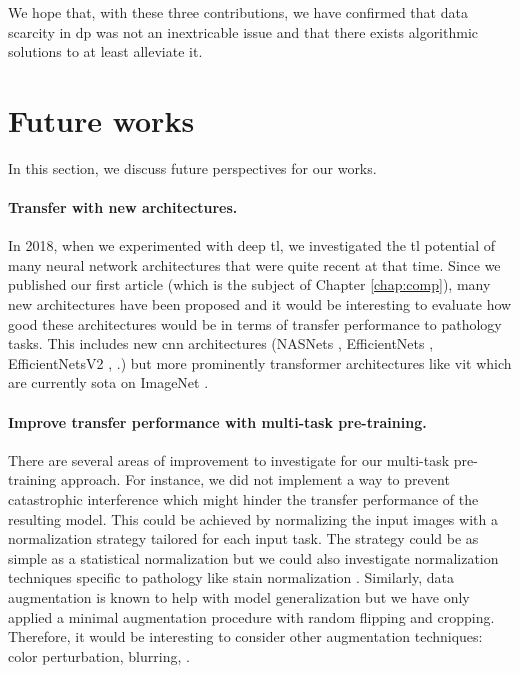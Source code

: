 We hope that, with these three contributions, we have confirmed that data scarcity in \acrlong{dp} was not an inextricable issue and that there exists algorithmic solutions to at least alleviate it. 

\section{Future works}
\label{sec:concl:futureworks}

In this section, we discuss future perspectives for our works.

\paragraph{Transfer with new architectures.} In 2018, when we experimented with deep \acrlong{tl}, we investigated the \acrlong{tl} potential of many neural network architectures that were quite recent at that time. Since we published our first article (which is the subject of Chapter \ref{chap:comp}), many new architectures have been proposed and it would be interesting to evaluate how good these architectures would be in terms of transfer performance to pathology tasks. This includes new \acrlong{cnn} architectures (\eg NASNets \cite{zoph2018learning}, EfficientNets \cite{tan2019efficientnet}, EfficientNetsV2 \cite{tan2021efficientnetv2}, \etc.) but more prominently transformer architectures like \acrshort{vit} which are currently \acrlong{sota} on ImageNet \cite{yu2022coca}.

\paragraph{Improve transfer performance with multi-task pre-training.} There are several areas of improvement to investigate for our multi-task pre-training approach. For instance, we did not implement a way to prevent catastrophic interference which might hinder the transfer performance of the resulting model. This could be achieved by normalizing the input images with a normalization strategy tailored for each input task. The strategy could be as simple as a statistical normalization but we could also investigate normalization techniques specific to pathology like stain normalization \cite{kang2021stainnet, runz2021normalization}. Similarly, data augmentation is known to help with model generalization but we have only applied a minimal augmentation procedure with random flipping and cropping. Therefore, it would be interesting to consider other augmentation techniques: color perturbation, blurring, \etc. 

